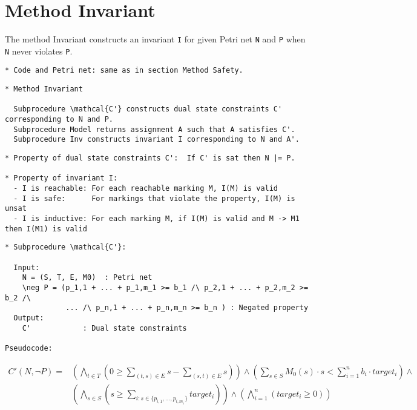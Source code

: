 \section{Method Invariant}

The method Invariant constructs an invariant \verb=I= for given Petri
net \verb=N= and \verb=P= when \verb=N= never violates \verb=P=.

\begin{verbatim}
* Code and Petri net: same as in section Method Safety.
\end{verbatim}

\begin{verbatim}
* Method Invariant

  Subprocedure \mathcal{C'} constructs dual state constraints C' corresponding to N and P.
  Subprocedure Model returns assignment A such that A satisfies C'.
  Subprocedure Inv constructs invariant I corresponding to N and A'.
\end{verbatim}




\begin{verbatim}
* Property of dual state constraints C':  If C' is sat then N |= P.

* Property of invariant I:
  - I is reachable: For each reachable marking M, I(M) is valid
  - I is safe:      For markings that violate the property, I(M) is unsat
  - I is inductive: For each marking M, if I(M) is valid and M -> M1 then I(M1) is valid
\end{verbatim}

\newpage

\begin{verbatim}
* Subprocedure \mathcal{C'}:

  Input:
    N = (S, T, E, M0)  : Petri net
    \neg P = (p_1,1 + ... + p_1,m_1 >= b_1 /\ p_2,1 + ... + p_2,m_2 >= b_2 /\
              ... /\ p_n,1 + ... + p_n,m_n >= b_n ) : Negated property
  Output:
    C'            : Dual state constraints

Pseudocode:
\end{verbatim}

\begin{align*}
  C'(N, \neg P) =& \left( \bigwedge_{t \in T} \left( 0 \ge
                      \sum_{(t, s) \in E} s
                    - \sum_{(s, t) \in E} s \right) \right) \land
     \left( \sum_{s \in S} M_0(s) \cdot s <
       \sum_{i=1}^n b_i \cdot target_i \right) \land \\
     & \left( \bigwedge_{s \in S} \left ( s \ge 
       \sum_{i : s \in \{ p_{i,1}, \ldots, p_{i,m_i} \} } target_i \right) \right) \land
     \left( \bigwedge_{i=1}^n \left( target_i \ge 0 \right) \right)
\end{align*}

